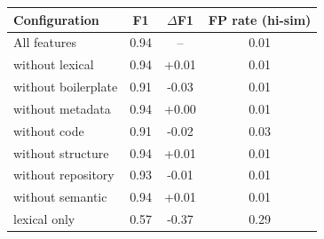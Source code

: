 \begin{tabular}{lccc}
\toprule
Configuration & F1 & $\Delta$F1 & FP rate (hi-sim) \\
\midrule
All features & 0.94 & -- & 0.01 \\
without lexical & 0.94 & +0.01 & 0.01 \\
without boilerplate & 0.91 & -0.03 & 0.01 \\
without metadata & 0.94 & +0.00 & 0.01 \\
without code & 0.91 & -0.02 & 0.03 \\
without structure & 0.94 & +0.01 & 0.01 \\
without repository & 0.93 & -0.01 & 0.01 \\
without semantic & 0.94 & +0.01 & 0.01 \\
lexical only & 0.57 & -0.37 & 0.29 \\
\bottomrule
\end{tabular}
